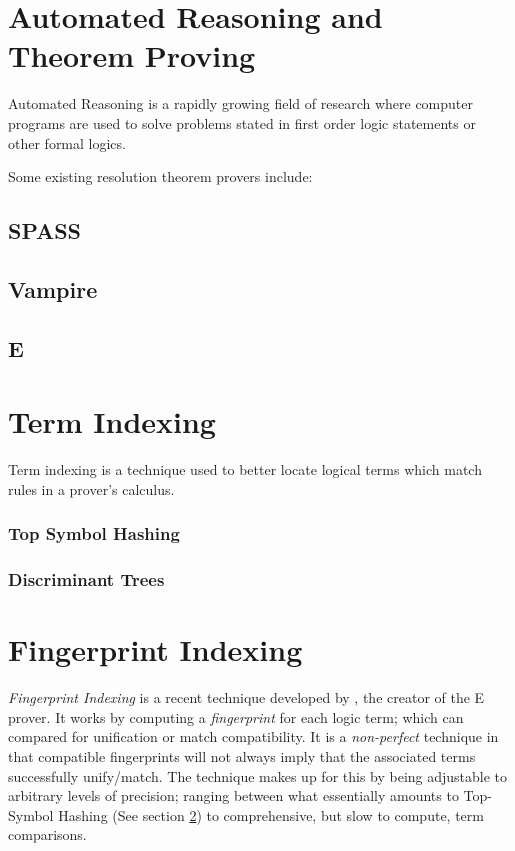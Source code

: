 \section{Automated Reasoning and Theorem Proving}
\label{sec:proving}

Automated Reasoning is a rapidly growing field of research where computer programs
are used to solve problems stated in first order logic statements or other formal logics.

Some existing resolution theorem provers include:

\subsection{SPASS}
\cite{spass}

\subsection{Vampire}
\cite{vampire}

\subsection{E}
\cite{eprover}

\section{Term Indexing}
\label{sec:indexing}

Term indexing is a technique used to better locate logical terms which match rules
in a prover's calculus.

\subsubsection{Top Symbol Hashing}

\subsubsection{Discriminant Trees}


\section{Fingerprint Indexing}
\label{sec:fingerprint}

\emph{Fingerprint Indexing} is a recent technique developed by , the creator
of the E prover. It works by computing a \emph{fingerprint} for each logic term;
which can compared for unification or match compatibility.
It is a \emph{non-perfect} technique in that compatible fingerprints will not
always imply that the associated terms successfully unify/match. The technique
makes up for this by being adjustable to arbitrary levels of precision; ranging between
what essentially amounts to Top-Symbol Hashing (See section \ref{sec:indexing})
to comprehensive, but slow to compute, term comparisons.

